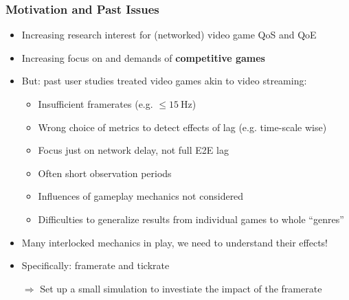 \documentclass{UDEbeamerEN}
\begin{document}
\begin{frame}
	\frametitle{Motivation and Past Issues}

	\begin{itemize}
		\item Increasing research interest for (networked) video game QoS and QoE
		\item Increasing focus on and demands of \textbf{competitive games}
		\item But: past user studies treated video games akin to video streaming:
			\pause
			\begin{itemize}
				\item Insufficient framerates (e.g. $\leq \SI{15}{\hertz}$)
				\item Wrong choice of metrics to detect effects of lag (e.g. time-scale wise)
				\item Focus just on network delay, not full E2E lag
				\item Often short observation periods
				\item Influences of gameplay mechanics not considered
				\item Difficulties to generalize results from individual games to whole ``genres''
			\end{itemize}

		\pause
		\item Many interlocked mechanics in play, we need to understand their effects!
		\item Specifically: framerate and tickrate
		\item[$\Rightarrow$] Set up a small simulation to investiate the impact of the framerate
	\end{itemize}

\end{frame}
\end{document}
